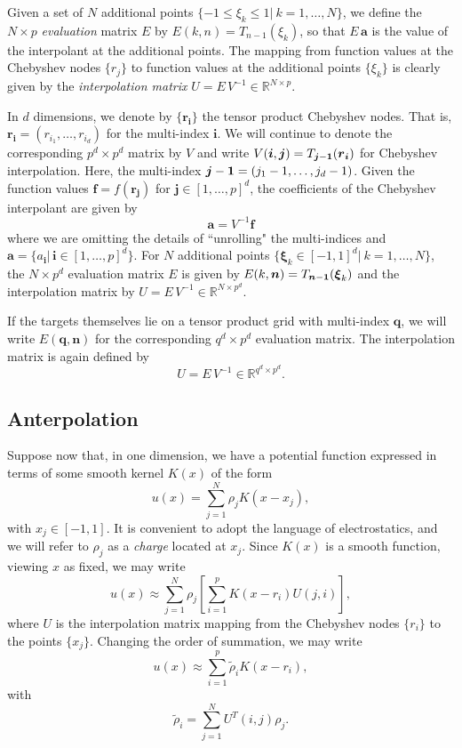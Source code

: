 \documentclass[final,letterpaper]{siamart171218}
\newcommand{\be}{\begin{equation}}
\newcommand{\ee}{\end{equation}}
\newcommand{\bn}{\boldsymbol{n}}
\newcommand{\bq}{\boldsymbol{q}}
\newcommand{\bxi}{\boldsymbol{\xi}}
\newcommand{\bfa}{\boldsymbol{a}}
\newcommand{\bff}{\boldsymbol{f}}
\newcommand{\bi}{\boldsymbol{i}}
\newcommand{\bj}{\boldsymbol{j}}
\newcommand{\br}{\boldsymbol{r}}
\begin{document}
Given a set of $N$ additional points $\{ -1 \leq \xi_k \leq 1 |\ k = 1,\dots,N \}$, we define
the $N \times p$ {\em evaluation} matrix $E$ by $E(k,n) = T_{n-1}(\xi_k)$, so that
$E \, \bfa$ is the value of the interpolant at the additional points.
The mapping from function values 
at the Chebyshev nodes $\{r_j\}$ to function values at the additional 
points $\{ \xi_k \}$ is clearly given
by  the {\em interpolation matrix} $U = E \, V^{-1} \in \mathbb{R}^{N\times p}$. 

In $d$ dimensions, we denote by 
$\{ \br_{\bi} \}$ the tensor product Chebyshev nodes. That is,
$\br_{\bi} = (r_{i_1},\dots,r_{i_d})$ for the multi-index $\bi$.
We will continue to 
denote the corresponding $p^d \times p^d$ matrix by $V$ and
write $V(\bi,\bj) = T_{\bj-{\bf 1}}(\br_{\bi})$ for Chebyshev interpolation.
Here, the multi-index ${\bj-{\bf 1}} = (j_1-1,\dots,j_d-1)$.
Given the function values $\bff = f(\br_{\bj})$ for $\bj \in [1,\dots,p]^d$, the 
coefficients of the Chebyshev interpolant are given by 
\[ \bfa = V^{-1} \bff  \]
where we are omitting the details of ``unrolling" the multi-indices and
$\bfa = \{ a_{\bi} | \, \bi \in [1,\dots,p]^d \}$.
For $N$ additional points $\{ \bxi_k \in [-1,1]^d |\ k = 1,\dots,N \}$, 
the $N \times p^d$ evaluation matrix $E$ is given by $E(k,\bn) = T_{\bn-{\bf 1}}(\bxi_k)$
and the interpolation matrix by 
$U = E \, V^{-1} \in \mathbb{R}^{N\times p^d}$. 

If the targets themselves lie on a tensor product grid with multi-index $\bq$, we will
write $E(\bq,\bn)$ for the corresponding $q^d \times p^d$ evaluation matrix. The 
interpolation matrix is again defined by
\be \label{Udefnd}
U = E \, V^{-1} \in \mathbb{R}^{q^d \times p^d}. 
\ee

\subsection{Anterpolation} \label{sec:anterp}

Suppose now that, in one dimension, 
we have a potential function expressed in terms of some smooth kernel $K(x)$ of the form
\be
u(x) = \sum_{j=1}^N \rho_j K(x-x_j),
\ee
with $x_j \in [-1,1]$.
It is convenient to adopt the language of electrostatics, and we will
refer to $\rho_j$ as a {\em charge} located at $x_j$. 
Since $K(x)$ is a smooth function, viewing $x$ as fixed, we may write
\be
u(x) \approx \sum_{j=1}^N \rho_j \left[ \sum_{i=1}^p K(x-r_i) U(j,i) \right],
\ee
where $U$ is the interpolation matrix mapping from the Chebyshev nodes $\{r_i\}$ to the
points $\{ x_j \}$.
Changing the order of summation, we may write
\be
u(x) \approx \sum_{i=1}^p \tilde{\rho}_i K(x-r_i),
\ee
with 
\be \label{proxy1d} 
\tilde{\rho}_i = \sum_{j=1}^N U^T(i,j) \rho_j.
\ee
\end{document}
